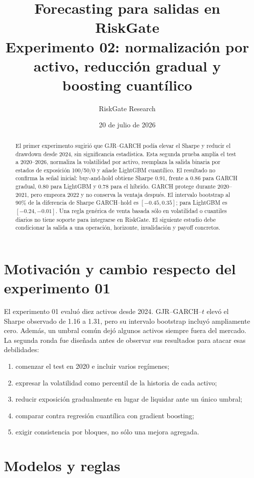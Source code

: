 \documentclass[11pt]{article}
\title{Forecasting para salidas en RiskGate\\\large Experimento 02: normalización por activo, reducción gradual y boosting cuantílico}
\author{RiskGate Research}
\date{20 de julio de 2026}
\begin{document}
\maketitle
\begin{abstract}
El primer experimento sugirió que GJR--GARCH podía elevar el Sharpe y reducir el drawdown desde 2024, sin
significancia estadística. Esta segunda prueba amplía el test a 2020--2026, normaliza la volatilidad por activo,
reemplaza la salida binaria por estados de exposición 100/50/0 y añade LightGBM cuantílico. El resultado no
confirma la señal inicial: buy-and-hold obtiene Sharpe 0.91, frente a 0.86 para GARCH gradual, 0.80 para LightGBM
y 0.78 para el híbrido. GARCH protege durante 2020--2021, pero empeora 2022 y no conserva la ventaja después.
El intervalo bootstrap al 90\% de la diferencia de Sharpe GARCH--hold es $[-0.45,0.35]$; para LightGBM es
$[-0.24,-0.01]$. Una regla genérica de venta basada sólo en volatilidad o cuantiles diarios no tiene soporte para
integrarse en RiskGate. El siguiente estudio debe condicionar la salida a una operación, horizonte, invalidación
y payoff concretos.
\end{abstract}

\section{Motivación y cambio respecto del experimento 01}
El experimento 01 evaluó diez activos desde 2024. GJR--GARCH--$t$ elevó el Sharpe observado de 1.16 a 1.31,
pero su intervalo bootstrap incluyó ampliamente cero. Además, un umbral común dejó algunos activos siempre
fuera del mercado. La segunda ronda fue diseñada antes de observar sus resultados para atacar esas debilidades:
\begin{enumerate}
  \item comenzar el test en 2020 e incluir varios regímenes;
  \item expresar la volatilidad como percentil de la historia de cada activo;
  \item reducir exposición gradualmente en lugar de liquidar ante un único umbral;
  \item comparar contra regresión cuantílica con gradient boosting;
  \item exigir consistencia por bloques, no sólo una mejora agregada.
\end{enumerate}

\section{Modelos y reglas}
\end{document}
